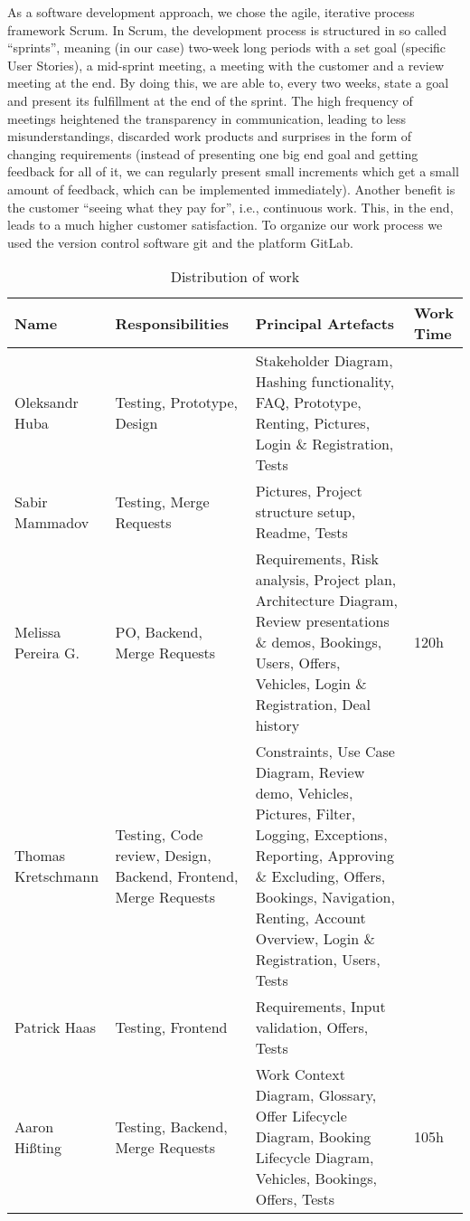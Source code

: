 As a software development approach, we chose the agile, iterative process framework Scrum. In Scrum, the development process is structured in so called “sprints”, meaning (in our case) two-week long periods with a set goal (specific User Stories), a mid-sprint meeting, a meeting with the customer and a review meeting at the end. By doing this, we are able to, every two weeks, state a goal and present its fulfillment at the end of the sprint. The high frequency of meetings heightened the transparency in communication, leading to less misunderstandings, discarded work products and surprises in the form of changing requirements (instead of presenting one big end goal and getting feedback for all of it, we can regularly present small increments which get a small amount of feedback, which can be implemented immediately). Another benefit is the customer “seeing what they pay for”, i.e., continuous work. This, in the end, leads to a much higher customer satisfaction. To organize our work process we used the version control software git and the platform GitLab.

\begin{table}[h]
  \caption{Distribution of work}
  \centering
  \begin{tabular}{|p{3cm}||p{3cm}|p{6cm}|p{2cm}|}
    \hline
    Name & Responsibilities & Principal Artefacts & Work Time \\
    \hline
    Oleksandr Huba & Testing, Prototype, Design & Stakeholder Diagram, Hashing functionality, FAQ, Prototype, Renting, Pictures, Login \& Registration, Tests & \\ \hline
    Sabir Mammadov & Testing, Merge Requests & Pictures, Project structure setup, Readme, Tests & \\ \hline
    Melissa Pereira G. & PO, Backend, Merge Requests & Requirements, Risk analysis, Project plan, Architecture Diagram, Review presentations \& demos, Bookings, Users, Offers, Vehicles, Login \& Registration, Deal history & 120h\\ \hline
    Thomas Kretschmann & Testing, Code review, Design, Backend, Frontend, Merge Requests & Constraints, Use Case Diagram, Review demo, Vehicles, Pictures, Filter, Logging, Exceptions, Reporting, Approving \& Excluding, Offers, Bookings, Navigation, Renting, Account Overview, Login \& Registration, Users, Tests & \\ \hline
    Patrick Haas & Testing, Frontend & Requirements, Input validation, Offers, Tests & \\ \hline
    Aaron Hißting & Testing, Backend, Merge Requests & Work Context Diagram, Glossary, Offer Lifecycle Diagram, Booking Lifecycle Diagram, Vehicles, Bookings, Offers, Tests & 105h\\ \hline
  \end{tabular}
\end{table}